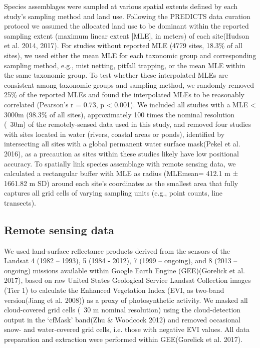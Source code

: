 Species assemblages were sampled at various spatial extents defined by each study’s sampling method and land use. Following the PREDICTS data curation protocol we assumed the allocated land use to be dominant within the reported sampling extent (maximum linear extent [MLE], in meters) of each site(Hudson et al. 2014, 2017). For studies without reported MLE (4779 sites, 18.3\% of all sites), we used either the mean MLE for each taxonomic group and corresponding sampling method, e.g., mist netting, pitfall trapping, or the mean MLE within the same taxonomic group. To test whether these interpolated MLEs are consistent among taxonomic groups and sampling method, we randomly removed 25\% of the reported MLEs and found the interpolated MLEs to be reasonably correlated (Pearson’s r = 0.73, p < 0.001). We included all studies with a MLE < 3000m (98.3\% of all sites), approximately 100 times the nominal resolution (~30m) of the remotely-sensed data used in this study, and removed four studies with sites located in water (rivers, coastal areas or ponds), identified by intersecting all sites with a global permanent water surface mask(Pekel et al. 2016), as a precaution as sites within these studies likely have low positional accuracy. To spatially link species assemblage with remote sensing data, we calculated a rectangular buffer with MLE as radius (MLEmean= 412.1 m ± 1661.82 m SD) around each site’s coordinates as the smallest area that fully captures all grid cells of varying sampling units (e.g., point counts, line transects). 

\subsection{Remote sensing data} 
We used land-surface reflectance products derived from the sensors of the Landsat 4 (1982 – 1993), 5 (1984 - 2012), 7 (1999 – ongoing), and 8 (2013 – ongoing) missions available within Google Earth Engine (GEE)(Gorelick et al. 2017), based on raw United States Geological Service Landsat Collection images (Tier 1) to calculate the Enhanced Vegetation Index (EVI, as two-band version(Jiang et al. 2008)) as a proxy of photosynthetic activity. We masked all cloud-covered grid cells (~30 m nominal resolution) using the cloud-detection output in the ‘cfMask’ band(Zhu & Woodcock 2012) and removed occasional snow- and water-covered grid cells, i.e. those with negative EVI values. All data preparation and extraction were performed within GEE(Gorelick et al. 2017).

